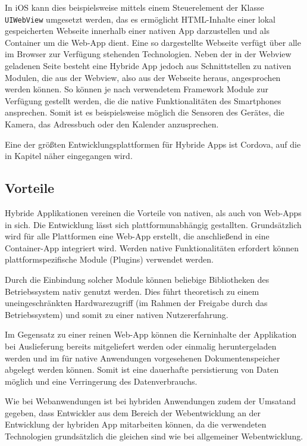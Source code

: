 In iOS kann dies beispielsweise mittels einem Steuerelement der Klasse \texttt{UIWebView} \cite{uiWebView} umgesetzt werden, das es ermöglicht HTML-Inhalte einer lokal gespeicherten Webseite innerhalb einer nativen App darzustellen und als Container um die Web-App dient. Eine so dargestellte Webseite verfügt über alle im Browser zur Verfügung stehenden Technologien. Neben der in der Webview geladenen Seite besteht eine Hybride App jedoch aus Schnittstellen zu nativen Modulen, die aus der Webview, also aus der Webseite heraus, angesprochen werden können. So können je nach verwendetem Framework Module zur Verfügung gestellt werden, die die native Funktionalitäten des Smartphones ansprechen. Somit ist es beispielsweise möglich die Sensoren des Gerätes, die Kamera, das Adressbuch oder den Kalender anzusprechen. 

Eine der größten Entwicklungsplattformen für Hybride Apps ist Cordova, auf die in Kapitel  näher eingegangen wird.  
%
\subsection{Vorteile}
Hybride Applikationen vereinen die Vorteile von nativen, als auch von Web-Apps in sich. Die Entwicklung lässt sich plattformunabhängig gestallten. Grundsätzlich wird für alle Plattformen eine Web-App erstellt, die anschließend in eine Container-App integriert wird. Werden native Funktionalitäten erfordert können plattformspezifische Module (Plugins) verwendet werden.

Durch die Einbindung solcher Module können beliebige Bibliotheken des Betriebssystem nativ genutzt werden. Dies führt theoretisch zu einem uneingeschränkten Hardwarezugriff (im Rahmen der Freigabe durch das Betriebssystem) und somit zu einer nativen Nutzererfahrung. 

Im Gegensatz zu einer reinen Web-App können die Kerninhalte der Applikation bei Auslieferung bereits mitgeliefert werden oder einmalig heruntergeladen werden und im für native Anwendungen vorgesehenen Dokumentenspeicher abgelegt werden können. Somit ist eine dauerhafte persistierung von Daten möglich und eine Verringerung des Datenverbrauchs.

Wie bei Webanwendungen ist bei hybriden Anwendungen zudem der Umsatand gegeben, dass Entwickler aus dem Bereich der Webentwicklung an der Entwicklung der hybriden App mitarbeiten können, da die verwendeten Technologien grundsätzlich die gleichen sind wie bei allgemeiner Webentwicklung. 
%
